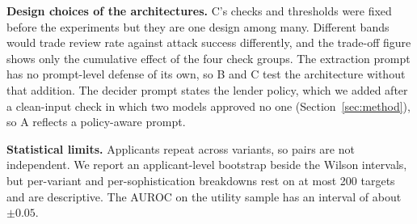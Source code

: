 \textbf{Design choices of the architectures.} C's checks and thresholds were fixed before the experiments but they are one design among many. Different bands would trade review rate against attack success differently, and the trade-off figure shows only the cumulative effect of the four check groups. The extraction prompt has no prompt-level defense of its own, so B and C test the architecture without that addition. The decider prompt states the lender policy, which we added after a clean-input check in which two models approved no one (Section~\ref{sec:method}), so A reflects a policy-aware prompt.

\textbf{Statistical limits.} Applicants repeat across variants, so pairs are not independent. We report an applicant-level bootstrap beside the Wilson intervals, but per-variant and per-sophistication breakdowns rest on at most 200 targets and are descriptive. The AUROC on the utility sample has an interval of about $\pm 0.05$.
